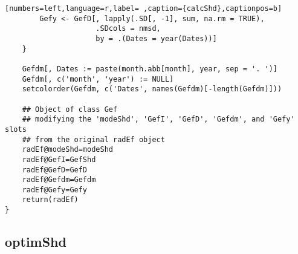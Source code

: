 \begin{lstlisting}[numbers=left,language=r,label= ,caption={calcShd},captionpos=b]
        Gefy <- GefD[, lapply(.SD[, -1], sum, na.rm = TRUE),
                     .SDcols = nmsd,
                     by = .(Dates = year(Dates))]
    }

    Gefdm[, Dates := paste(month.abb[month], year, sep = '. ')]
    Gefdm[, c('month', 'year') := NULL]
    setcolorder(Gefdm, c('Dates', names(Gefdm)[-length(Gefdm)]))

    ## Object of class Gef
    ## modifying the 'modeShd', 'GefI', 'GefD', 'Gefdm', and 'Gefy' slots
    ## from the original radEf object
    radEf@modeShd=modeShd
    radEf@GefI=GefShd
    radEf@GefD=GefD
    radEf@Gefdm=Gefdm
    radEf@Gefy=Gefy
    return(radEf)
}
\end{lstlisting}
\subsection{optimShd}
\label{sec:org2f4de07}
\label{subsec:optimShd}
